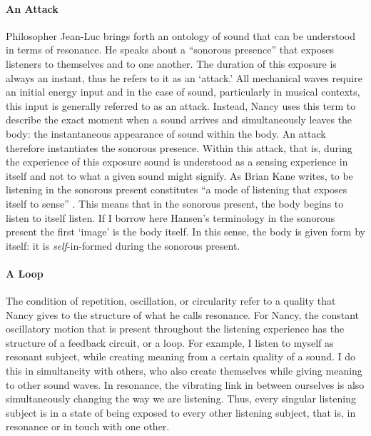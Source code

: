\paragraph{An Attack}
Philosopher Jean-Luc \textcite{Nan07:Lis} brings forth an ontology of sound that can be understood in terms of resonance. He speaks about a ``sonorous presence'' that exposes listeners to themselves and to one another. The duration of this exposure is always an instant, thus he refers to it as an `attack.' All mechanical waves require an initial energy input and in the case of sound, particularly in musical contexts, this input is generally referred to as an attack. Instead, Nancy uses this term to describe the exact moment when a sound arrives and simultaneously leaves the body: the instantaneous appearance of sound within the body. An attack therefore instantiates the sonorous presence. Within this attack, that is, during the experience of this exposure sound is understood as a sensing experience in itself and not to what a given sound might signify. As Brian Kane writes, to be listening in the sonorous present constitutes ``a mode of listening that exposes itself to sense'' \parencite[143-144]{Gra15:The}. This means that in the sonorous present, the body begins to listen to itself listen. If I borrow here Hansen's terminology  in the sonorous present the first `image' is the body itself. In this sense, the body is given form by itself: it is \textit{self}-in-formed during the sonorous present.

\paragraph{A Loop}
The condition of repetition, oscillation, or circularity refer to a quality that Nancy gives to the structure of what he calls resonance. For Nancy, the constant oscillatory motion that is present throughout the listening experience has the structure of a feedback circuit, or a loop. For example, I listen to myself as resonant subject, while creating meaning from a certain quality of a sound. I do this in simultaneity with others, who also create themselves while giving meaning to other sound waves. In resonance, the vibrating link in between ourselves is also simultaneously changing the way we are listening. Thus, every singular listening subject is in a state of being exposed to every other listening subject, that is, in resonance or in touch with one other.

